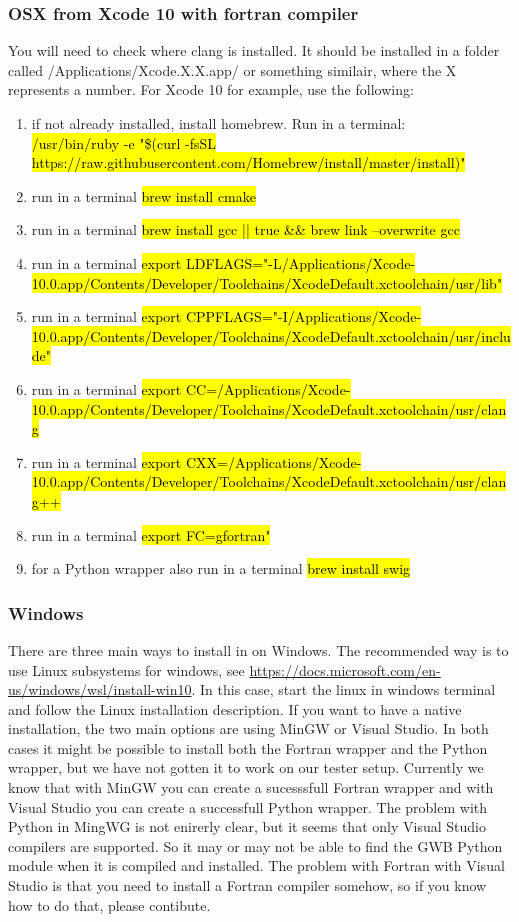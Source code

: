 \documentclass{book}
\begin{document}
\subsubsection{OSX from Xcode 10 with fortran compiler}
You will need to check where clang is installed. It should be installed in a folder called /Applications/Xcode.X.X.app/ or something similair, where the X represents a number. For Xcode 10 for example, use the following:
\begin{enumerate}
    \item if not already installed, install homebrew. Run in a terminal:\\ \hl{/usr/bin/ruby -e "\$(curl -fsSL https://raw.githubusercontent.com/Homebrew/install/master/install)"}
    \item run in a terminal \hl{brew install cmake} 
    \item run in a terminal \hl{brew install gcc || true  \&\& brew link --overwrite gcc} 
    \item run in a terminal \hl{export LDFLAGS="-L/Applications/Xcode-10.0.app/Contents/Developer/Toolchains/XcodeDefault.xctoolchain/usr/lib"}
    \item run in a terminal \hl{export CPPFLAGS="-I/Applications/Xcode-10.0.app/Contents/Developer/Toolchains/XcodeDefault.xctoolchain/usr/include"}
    \item run in a terminal \hl{export CC=/Applications/Xcode-10.0.app/Contents/Developer/Toolchains/XcodeDefault.xctoolchain/usr/clang}
    \item run in a terminal \hl{export CXX=/Applications/Xcode-10.0.app/Contents/Developer/Toolchains/XcodeDefault.xctoolchain/usr/clang++}
    \item run in a terminal \hl{export FC=gfortran"}
    \item for a Python wrapper also run in a terminal \hl{brew install swig} 
\end{enumerate}
\subsubsection{Windows}
There are three main ways to install in on Windows. The recommended way is to use Linux subsystems for windows, see \url{https://docs.microsoft.com/en-us/windows/wsl/install-win10}. In this case, start the linux in windows terminal and follow the Linux installation description. If you want to have a native installation, the two main options are using MinGW or Visual Studio. 
In both cases it might be possible to install both the Fortran wrapper and the Python wrapper, but we have not gotten it to work on our tester setup. Currently we know that with MinGW you can create a sucesssfull Fortran wrapper and with Visual Studio you can create a successfull Python wrapper. The problem with Python in MingWG is not enirerly clear, but it seems that only Visual Studio compilers are supported. So it may or may not be able to find the GWB Python module when it is compiled and installed. 
The problem with Fortran with Visual Studio is that you need to install a Fortran compiler somehow, so if you know how to do that, please contibute.
\end{document}
